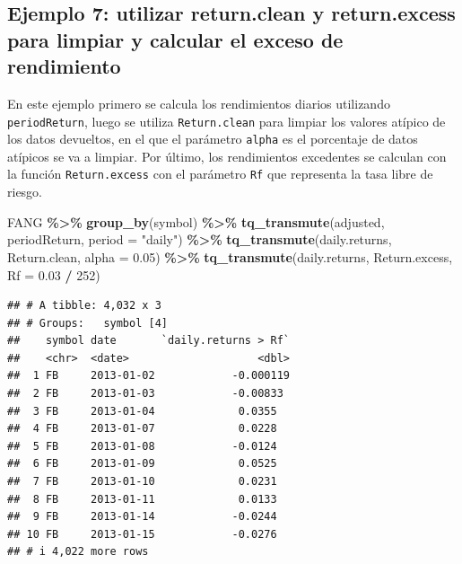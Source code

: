 \documentclass[
]{book}
\newenvironment{Shaded}{\begin{snugshade}}{\end{snugshade}}
\newcommand{\AttributeTok}[1]{\textcolor[rgb]{0.13,0.29,0.53}{#1}}
\newcommand{\DecValTok}[1]{\textcolor[rgb]{0.00,0.00,0.81}{#1}}
\newcommand{\FloatTok}[1]{\textcolor[rgb]{0.00,0.00,0.81}{#1}}
\newcommand{\FunctionTok}[1]{\textcolor[rgb]{0.13,0.29,0.53}{\textbf{#1}}}
\newcommand{\NormalTok}[1]{#1}
\newcommand{\SpecialCharTok}[1]{\textcolor[rgb]{0.81,0.36,0.00}{\textbf{#1}}}
\newcommand{\StringTok}[1]{\textcolor[rgb]{0.31,0.60,0.02}{#1}}
\begin{document}
\hypertarget{ejemplo-7-utilizar-return.clean-y-return.excess-para-limpiar-y-calcular-el-exceso-de-rendimiento}{%
\subsection{Ejemplo 7: utilizar return.clean y return.excess para limpiar y calcular el exceso de rendimiento}\label{ejemplo-7-utilizar-return.clean-y-return.excess-para-limpiar-y-calcular-el-exceso-de-rendimiento}}

En este ejemplo primero se calcula los rendimientos diarios utilizando \texttt{periodReturn}, luego se utiliza \texttt{Return.clean} para limpiar los valores atípico de los datos devueltos, en el que el parámetro \texttt{alpha} es el porcentaje de datos atípicos se va a limpiar. Por último, los rendimientos excedentes se calculan con la función \texttt{Return.excess} con el parámetro \texttt{Rf} que representa la tasa libre de riesgo.

\begin{Shaded}
\begin{Highlighting}[]
\NormalTok{FANG }\SpecialCharTok{\%\textgreater{}\%} \FunctionTok{group\_by}\NormalTok{(symbol) }\SpecialCharTok{\%\textgreater{}\%} \FunctionTok{tq\_transmute}\NormalTok{(adjusted, periodReturn, }\AttributeTok{period =} \StringTok{"daily"}\NormalTok{) }\SpecialCharTok{\%\textgreater{}\%}
                              \FunctionTok{tq\_transmute}\NormalTok{(daily.returns, Return.clean, }\AttributeTok{alpha =} \FloatTok{0.05}\NormalTok{) }\SpecialCharTok{\%\textgreater{}\%}
                              \FunctionTok{tq\_transmute}\NormalTok{(daily.returns, Return.excess, }\AttributeTok{Rf =} \FloatTok{0.03} \SpecialCharTok{/} \DecValTok{252}\NormalTok{)}
\end{Highlighting}
\end{Shaded}

\begin{verbatim}
## # A tibble: 4,032 x 3
## # Groups:   symbol [4]
##    symbol date       `daily.returns > Rf`
##    <chr>  <date>                    <dbl>
##  1 FB     2013-01-02            -0.000119
##  2 FB     2013-01-03            -0.00833 
##  3 FB     2013-01-04             0.0355  
##  4 FB     2013-01-07             0.0228  
##  5 FB     2013-01-08            -0.0124  
##  6 FB     2013-01-09             0.0525  
##  7 FB     2013-01-10             0.0231  
##  8 FB     2013-01-11             0.0133  
##  9 FB     2013-01-14            -0.0244  
## 10 FB     2013-01-15            -0.0276  
## # i 4,022 more rows
\end{verbatim}
\end{document}
